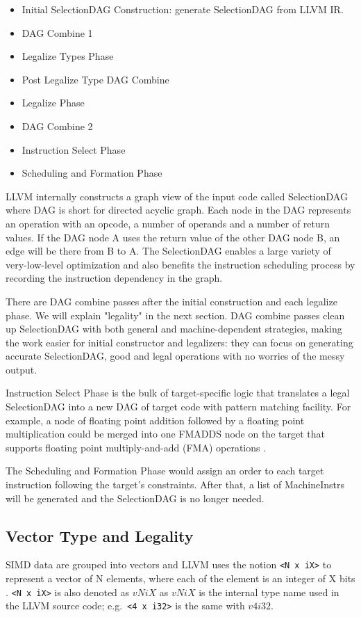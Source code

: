 \begin{itemize}
  \item Initial SelectionDAG Construction: generate SelectionDAG from LLVM IR.
  \item DAG Combine 1
  \item Legalize Types Phase
  \item Post Legalize Type DAG Combine
  \item Legalize Phase
  \item DAG Combine 2
  \item Instruction Select Phase
  \item Scheduling and Formation Phase
\end{itemize}

LLVM internally constructs a graph view of the input code called SelectionDAG where DAG is short for directed acyclic graph. Each node in the DAG represents an operation with an opcode, a number of operands and a number of return values. If the DAG node A uses the return value of the other DAG node B, an edge will be there from B to A. The SelectionDAG enables a large variety of very-low-level optimization and also benefits the instruction scheduling process by recording the instruction dependency in the graph.

There are DAG combine passes after the initial construction and each legalize phase\cite{llvm_code_gen}. We will explain "legality" in the next section. DAG combine passes clean up SelectionDAG with both general and machine-dependent strategies, making the work easier for initial constructor and legalizers: they can focus on generating accurate SelectionDAG, good and legal operations with no worries of the messy output.

Instruction Select Phase is the bulk of target-specific logic that translates a legal SelectionDAG into a new DAG of target code with pattern matching facility. For example, a node of floating point addition followed by a floating point multiplication could be merged into one FMADDS node on the target that supports floating point multiply-and-add (FMA) operations \cite{llvm_code_gen}.

The Scheduling and Formation Phase would assign an order to each target instruction following the target's constraints. After that, a list of MachineInstrs will be generated and the SelectionDAG is no longer needed.

\subsection{Vector Type and Legality}
SIMD data are grouped into vectors and LLVM uses the notion \verb|<N x iX>| to represent a vector of N elements, where each of the element is an integer of X bits \cite{llvm_lang_ref, hybrid_simd_type_legalize}. \verb|<N x iX>| is also denoted as $vNiX$ as $vNiX$ is the internal type name used in the LLVM source code; e.g.\ \verb|<4 x i32>| is the same with $v4i32$.

